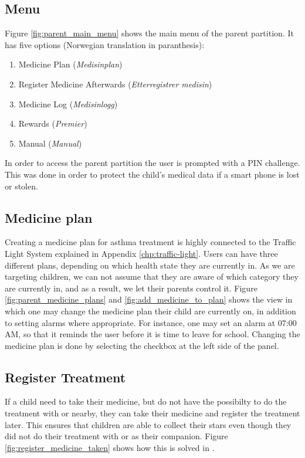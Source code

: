 \subsection{Menu}
\label{sec:description-menu}
Figure \ref{fig:parent_main_menu} shows the main menu of the parent partition. It has five options (Norwegian translation in paranthesis):
\begin{enumerate}
  \item Medicine Plan (\emph{Medisinplan})
  \item Register Medicine Afterwards (\emph{Etterregistrer medisin})
  \item Medicine Log (\emph{Medisinlogg})
  \item Rewards (\emph{Premier})
  \item Manual (\emph{Manual})
\end{enumerate} 

In order to access the parent partition the user is prompted with a PIN challenge. This was done in order to protect the child's medical data if a smart phone is lost or stolen. 

\subsection{Medicine plan}
\label{sec:description-medicine-plan}
Creating a medicine plan for asthma treatment is highly connected to the Traffic Light System explained in Appendix \ref{chp:traffic-light}.
Users can have three different plans, depending on which health state they are currently in. As we are targeting children, we can not assume that they are aware of which category they are currently in, and as a result, we let their parents control it. Figure \ref{fig:parent_medicine_plans} and \ref{fig:add_medicine_to_plan} shows the view in which one may change the medicine plan their child are currently on, in addition to setting alarms where appropriate. For instance, one may set an alarm at 07:00 AM, so that it reminds the user before it is time to leave for school. Changing the medicine plan is done by selecting the checkbox at the left side of the panel.  


\subsection{Register Treatment}
\label{sec:description-register-medicine}

If a child need to take their medicine, but do not have the possibilty to do the treatment with \ab{} or \app{} nearby, they can take their medicine and register the treatment later. This ensures that children are able to collect their stars even though they did not do their treatment with \ab{} or \app{} as their companion. Figure \ref{fig:register_medicine_taken} shows how this is solved in \app{}.  

